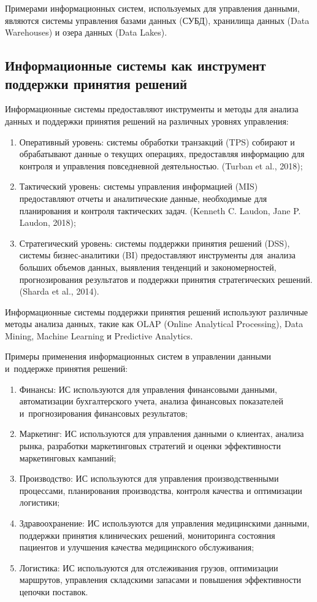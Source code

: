 \documentclass{ou}
\begin{document}
Примерами информационных систем, используемых для управления данными, являются системы управления базами данных (СУБД), хранилища данных (Data Warehouses) и озера данных (Data Lakes).
\subsection{Информационные системы как инструмент поддержки принятия решений}
Информационные системы предоставляют инструменты и методы для анализа данных и поддержки принятия решений на различных уровнях управления:
\begin{enumerate}[leftmargin=0em, itemindent=3.75em, nosep, label=\arabic*)]
\item Оперативный уровень: системы обработки транзакций (TPS) собирают и обрабатывают данные о текущих операциях, предоставляя информацию для контроля и управления повседневной деятельностью. (Turban et al., 2018);
\item Тактический уровень: системы управления информацией (MIS) предоставляют отчеты и аналитические данные, необходимые для планирования и контроля тактических задач. (Kenneth C. Laudon, Jane P. Laudon, 2018);
\item Стратегический уровень: системы поддержки принятия решений (DSS), системы бизнес-аналитики (BI) предоставляют инструменты для~анализа больших объемов данных, выявления тенденций и закономерностей, прогнозирования результатов и поддержки принятия стратегических решений. (Sharda et al., 2014).
\end{enumerate}
Информационные системы поддержки принятия решений используют различные методы анализа данных, такие как OLAP (Online Analytical Processing), Data Mining, Machine Learning и Predictive Analytics.

Примеры применения информационных систем в управлении данными и~поддержке принятия решений:
\begin{enumerate}[leftmargin=0em, itemindent=3.75em, nosep, label=\arabic*)]
\item Финансы: ИС используются для управления финансовыми данными, автоматизации бухгалтерского учета, анализа финансовых показателей и~прогнозирования финансовых результатов;
\item Маркетинг: ИС используются для управления данными о клиентах, анализа рынка, разработки маркетинговых стратегий и оценки эффективности маркетинговых кампаний;
\item Производство: ИС используются для управления производственными процессами, планирования производства, контроля качества и оптимизации логистики;
\item Здравоохранение: ИС используются для управления медицинскими данными, поддержки принятия клинических решений, мониторинга состояния пациентов и улучшения качества медицинского обслуживания;
\item Логистика: ИС используются для отслеживания грузов, оптимизации маршрутов, управления складскими запасами и повышения эффективности цепочки поставок.
\end{enumerate}
\end{document}
